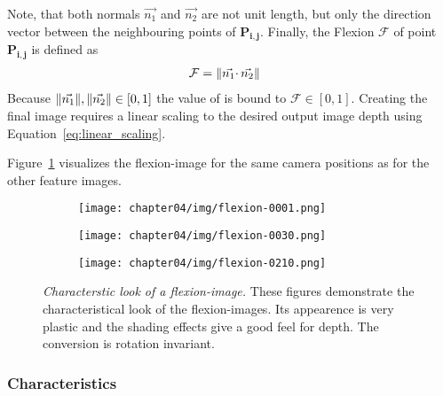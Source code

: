 Note, that both normals $\vec{n_1}$ and $\vec{n_2}$ are not unit length, but only the direction vector between the neighbouring points of $\mathbf{P_{i,j}}$.
Finally, the Flexion $\mathcal{F}$ of point $\mathbf{P_{i,j}}$ is defined as
\begin{align}
    \mathcal{F} &= \lVert\vec{n_1} \cdotp \vec{n_2}\rVert
\end{align}
Because $\lVert\vec{n_1}\rVert,\lVert\vec{n_2}\rVert \in [0,1]$ the value of is bound to $\mathcal{F} \in [0, 1]$.
Creating the final image requires a linear scaling to the desired output image depth using Equation~\ref{eq:linear_scaling}.

Figure~\ref{fig:flexion_images} visualizes the \Gls{flexion-image} for the same camera positions as for the other feature images.
\begin{figure}[H]
    \begin{subfigure}[t]{0.32\textwidth}
        \texttt{[image: chapter04/img/flexion-0001.png]}
    \end{subfigure}
    \begin{subfigure}[t]{0.32\textwidth}
        \texttt{[image: chapter04/img/flexion-0030.png]}
    \end{subfigure}
    \begin{subfigure}[t]{0.32\textwidth}
        \texttt{[image: chapter04/img/flexion-0210.png]}
    \end{subfigure}
    \caption[Characterstic look of a \gls{flexion-image}]{\emph{Characterstic look of a \gls{flexion-image}.} These figures demonstrate the characteristical look of the \Glspl{flexion-image}. Its appearence is very plastic and the shading effects give a good feel for depth. The conversion is rotation invariant.}\label{fig:flexion_images}
\end{figure}

\subsubsection*{Characteristics}

